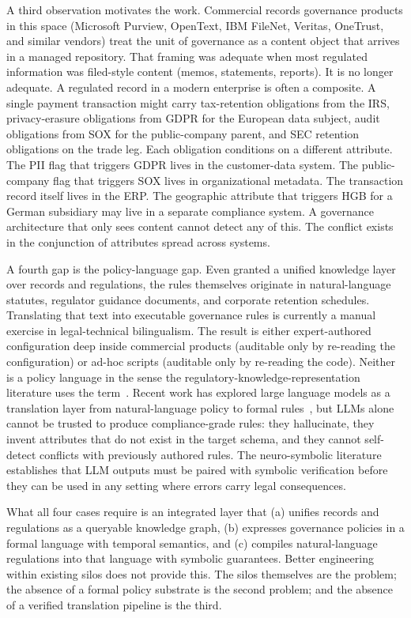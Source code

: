 \documentclass{ieeeaccess}
\begin{document}
A third observation motivates the work. Commercial records governance products in this space (Microsoft Purview, OpenText, IBM FileNet, Veritas, OneTrust, and similar vendors) treat the unit of governance as a content object that arrives in a managed repository. That framing was adequate when most regulated information was filed-style content (memos, statements, reports). It is no longer adequate. A regulated record in a modern enterprise is often a composite. A single payment transaction might carry tax-retention obligations from the IRS, privacy-erasure obligations from GDPR for the European data subject, audit obligations from SOX for the public-company parent, and SEC retention obligations on the trade leg. Each obligation conditions on a different attribute. The PII flag that triggers GDPR lives in the customer-data system. The public-company flag that triggers SOX lives in organizational metadata. The transaction record itself lives in the ERP. The geographic attribute that triggers HGB for a German subsidiary may live in a separate compliance system. A governance architecture that only sees content cannot detect any of this. The conflict exists in the conjunction of attributes spread across systems.

A fourth gap is the policy-language gap. Even granted a unified knowledge layer over records and regulations, the rules themselves originate in natural-language statutes, regulator guidance documents, and corporate retention schedules. Translating that text into executable governance rules is currently a manual exercise in legal-technical bilingualism. The result is either expert-authored configuration deep inside commercial products (auditable only by re-reading the configuration) or ad-hoc scripts (auditable only by re-reading the code). Neither is a policy language in the sense the regulatory-knowledge-representation literature uses the term~\cite{xacml,rego,cedar,legalruleml}. Recent work has explored large language models as a translation layer from natural-language policy to formal rules~\cite{nl2ltl,req2ltl,nist_lawal2025}, but LLMs alone cannot be trusted to produce compliance-grade rules: they hallucinate, they invent attributes that do not exist in the target schema, and they cannot self-detect conflicts with previously authored rules. The neuro-symbolic literature~\cite{garcez2020,bifrostrag} establishes that LLM outputs must be paired with symbolic verification before they can be used in any setting where errors carry legal consequences.

What all four cases require is an integrated layer that (a) unifies records and regulations as a queryable knowledge graph, (b) expresses governance policies in a formal language with temporal semantics, and (c) compiles natural-language regulations into that language with symbolic guarantees. Better engineering within existing silos does not provide this. The silos themselves are the problem; the absence of a formal policy substrate is the second problem; and the absence of a verified translation pipeline is the third.
\end{document}
